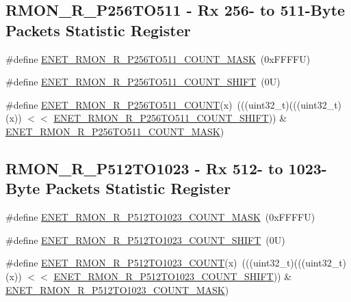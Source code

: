 \subsection*{R\+M\+O\+N\+\_\+\+R\+\_\+\+P256\+T\+O511 -\/ Rx 256-\/ to 511-\/\+Byte Packets Statistic Register}
\begin{DoxyCompactItemize}
\item 
\#define \mbox{\hyperlink{group___e_n_e_t___register___masks_ga0e2ba73bff150ae6ebad2d1b312a6ba2}{E\+N\+E\+T\+\_\+\+R\+M\+O\+N\+\_\+\+R\+\_\+\+P256\+T\+O511\+\_\+\+C\+O\+U\+N\+T\+\_\+\+M\+A\+SK}}~(0x\+F\+F\+F\+F\+U)
\item 
\#define \mbox{\hyperlink{group___e_n_e_t___register___masks_ga884a28c733b9e8454b467dabce9d1059}{E\+N\+E\+T\+\_\+\+R\+M\+O\+N\+\_\+\+R\+\_\+\+P256\+T\+O511\+\_\+\+C\+O\+U\+N\+T\+\_\+\+S\+H\+I\+FT}}~(0\+U)
\item 
\#define \mbox{\hyperlink{group___e_n_e_t___register___masks_gacf7caa034e550af1f45e8821dcebcb0e}{E\+N\+E\+T\+\_\+\+R\+M\+O\+N\+\_\+\+R\+\_\+\+P256\+T\+O511\+\_\+\+C\+O\+U\+NT}}(x)~(((uint32\+\_\+t)(((uint32\+\_\+t)(x)) $<$$<$ \mbox{\hyperlink{group___e_n_e_t___register___masks_ga884a28c733b9e8454b467dabce9d1059}{E\+N\+E\+T\+\_\+\+R\+M\+O\+N\+\_\+\+R\+\_\+\+P256\+T\+O511\+\_\+\+C\+O\+U\+N\+T\+\_\+\+S\+H\+I\+FT}})) \& \mbox{\hyperlink{group___e_n_e_t___register___masks_ga0e2ba73bff150ae6ebad2d1b312a6ba2}{E\+N\+E\+T\+\_\+\+R\+M\+O\+N\+\_\+\+R\+\_\+\+P256\+T\+O511\+\_\+\+C\+O\+U\+N\+T\+\_\+\+M\+A\+SK}})
\end{DoxyCompactItemize}
\subsection*{R\+M\+O\+N\+\_\+\+R\+\_\+\+P512\+T\+O1023 -\/ Rx 512-\/ to 1023-\/\+Byte Packets Statistic Register}
\begin{DoxyCompactItemize}
\item 
\#define \mbox{\hyperlink{group___e_n_e_t___register___masks_ga0b38c45c87433335a5cc1e65eaca9f67}{E\+N\+E\+T\+\_\+\+R\+M\+O\+N\+\_\+\+R\+\_\+\+P512\+T\+O1023\+\_\+\+C\+O\+U\+N\+T\+\_\+\+M\+A\+SK}}~(0x\+F\+F\+F\+F\+U)
\item 
\#define \mbox{\hyperlink{group___e_n_e_t___register___masks_ga2cc28edd9bf71e3f65d514fd9e1ba3ba}{E\+N\+E\+T\+\_\+\+R\+M\+O\+N\+\_\+\+R\+\_\+\+P512\+T\+O1023\+\_\+\+C\+O\+U\+N\+T\+\_\+\+S\+H\+I\+FT}}~(0\+U)
\item 
\#define \mbox{\hyperlink{group___e_n_e_t___register___masks_ga116549b0b0b2c1813d9ffc1f6657a07d}{E\+N\+E\+T\+\_\+\+R\+M\+O\+N\+\_\+\+R\+\_\+\+P512\+T\+O1023\+\_\+\+C\+O\+U\+NT}}(x)~(((uint32\+\_\+t)(((uint32\+\_\+t)(x)) $<$$<$ \mbox{\hyperlink{group___e_n_e_t___register___masks_ga2cc28edd9bf71e3f65d514fd9e1ba3ba}{E\+N\+E\+T\+\_\+\+R\+M\+O\+N\+\_\+\+R\+\_\+\+P512\+T\+O1023\+\_\+\+C\+O\+U\+N\+T\+\_\+\+S\+H\+I\+FT}})) \& \mbox{\hyperlink{group___e_n_e_t___register___masks_ga0b38c45c87433335a5cc1e65eaca9f67}{E\+N\+E\+T\+\_\+\+R\+M\+O\+N\+\_\+\+R\+\_\+\+P512\+T\+O1023\+\_\+\+C\+O\+U\+N\+T\+\_\+\+M\+A\+SK}})
\end{DoxyCompactItemize}
